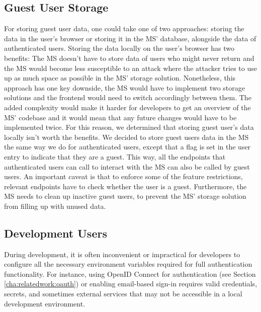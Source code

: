 \subsection{Guest User Storage}
\label{cha:conceptanddesign:users:guestuserstorage}

For storing guest user data, one could take one of two approaches:
storing the data in the user's browser or storing it in the MS' database, alongside the
data of authenticated users.
Storing the data locally on the user's browser has two benefits:
The MS doesn't have to store data of users who might never return and
the MS would become less susceptible to an attack where the attacker tries to use up as
much space as possible in the MS' storage solution.
Nonetheless, this approach has one key downside, the MS would have to implement two storage
solutions and the frontend would need to switch accordingly between them.
The added complexity would make it harder for developers to get an overview of the MS'
codebase and it would mean that any future changes would have to be implemented twice.
For this reason, we determined that storing guest user's data locally isn't worth the benefits.
We decided to store guest users data in the MS the same way we do for
authenticated users,
except that a flag is set
in the user entry to indicate that they are a guest.
This way, all the endpoints that authenticated users can call to interact with the MS
can also be called by guest users.
An important caveat is that to enforce some of the feature restrictions, relevant
endpoints have to check whether the user is a guest.
Furthermore, the MS needs to clean up inactive guest users, to prevent the MS' storage
solution from filling up with unused data.

\subsection{Development Users}

During development, it is often inconvenient or impractical for developers to configure all the necessary environment variables required for full authentication functionality.
For instance, using OpenID Connect for authentication (see Section \ref{cha:relatedwork:oauth}) or enabling email-based sign-in requires valid credentials, secrets, and sometimes external services that may not be accessible in a local development environment.


